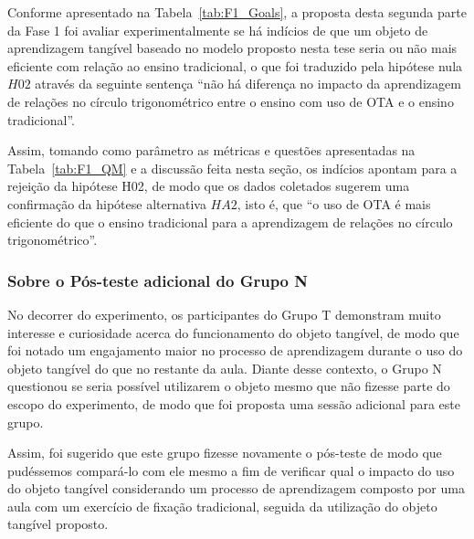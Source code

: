 Conforme apresentado na Tabela~\ref{tab:F1_Goals}, a proposta desta segunda parte da Fase 1 foi avaliar experimentalmente se há indícios de que um objeto de aprendizagem tangível baseado no modelo proposto nesta tese seria ou não mais eficiente com relação ao ensino tradicional, o que foi traduzido pela hipótese nula $H02$ através da seguinte sentença ``não há diferença no impacto da aprendizagem de relações no círculo trigonométrico entre o ensino com uso de OTA e o ensino tradicional''.

Assim, tomando como parâmetro as métricas e questões apresentadas na Tabela~\ref{tab:F1_QM} e a discussão feita nesta seção, os indícios apontam para a rejeição da hipótese H02, de modo que os dados coletados sugerem uma confirmação da hipótese alternativa $HA2$, isto é, que ``o uso de OTA é mais eficiente do que o ensino tradicional para a aprendizagem de relações no círculo trigonométrico''.

\subsubsection{Sobre o Pós-teste adicional do Grupo N}\label{subsec:fase1-posteste2}

No decorrer do experimento, os participantes do Grupo T demonstram muito interesse e curiosidade acerca do funcionamento do objeto tangível, de modo que foi notado um engajamento maior no processo de aprendizagem durante o uso do objeto tangível do que no restante da aula. Diante desse contexto, o Grupo N questionou se seria possível utilizarem o objeto mesmo que não fizesse parte do escopo do experimento, de modo que foi proposta uma sessão adicional para este grupo.

Assim, foi sugerido que este grupo fizesse novamente o pós-teste de modo que pudéssemos compará-lo com ele mesmo a fim de verificar qual o impacto do uso do objeto tangível considerando um processo de aprendizagem composto por uma aula com um exercício de fixação tradicional, seguida da utilização do objeto tangível proposto.


